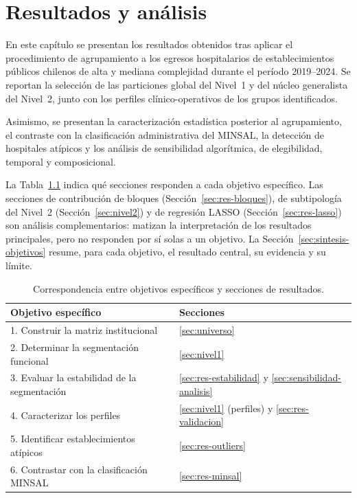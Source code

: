 \chapter{Resultados y análisis}
\label{cap:resultados}

En este capítulo se presentan los resultados obtenidos tras aplicar el
procedimiento de agrupamiento a los egresos hospitalarios de establecimientos
públicos chilenos de alta y mediana complejidad durante el período 2019--2024.
Se reportan la selección de las particiones global del Nivel~1 y del núcleo
generalista del Nivel~2, junto con los perfiles clínico-operativos de los grupos
identificados.

Asimismo, se presentan la caracterización estadística posterior al
agrupamiento, el contraste con la clasificación administrativa del MINSAL, la
detección de hospitales atípicos y los análisis de sensibilidad algorítmica, de
elegibilidad, temporal y composicional.

La Tabla~\ref{tab:hoja-ruta} indica qué secciones responden a cada objetivo
específico. Las secciones de contribución de bloques
(Sección~\ref{sec:res-bloques}), de subtipología del Nivel~2
(Sección~\ref{sec:nivel2}) y de regresión LASSO
(Sección~\ref{sec:res-lasso}) son análisis complementarios: matizan la
interpretación de los resultados principales, pero no responden por sí solas a
un objetivo. La Sección~\ref{sec:sintesis-objetivos} resume, para cada objetivo,
el resultado central, su evidencia y su límite.

\begin{table}[htbp]
\centering
\caption{Correspondencia entre objetivos específicos y secciones de resultados.}
\label{tab:hoja-ruta}
\begin{tabular}{p{7.5cm} p{6cm}}
\toprule
\textbf{Objetivo específico} & \textbf{Secciones} \\
\midrule
1. Construir la matriz institucional & \ref{sec:universo} \\
2. Determinar la segmentación funcional & \ref{sec:nivel1} \\
3. Evaluar la estabilidad de la segmentación & \ref{sec:res-estabilidad} y \ref{sec:sensibilidad-analisis} \\
4. Caracterizar los perfiles & \ref{sec:nivel1} (perfiles) y \ref{sec:res-validacion} \\
5. Identificar establecimientos atípicos & \ref{sec:res-outliers} \\
6. Contrastar con la clasificación MINSAL & \ref{sec:res-minsal} \\
\bottomrule
\end{tabular}
\end{table}

